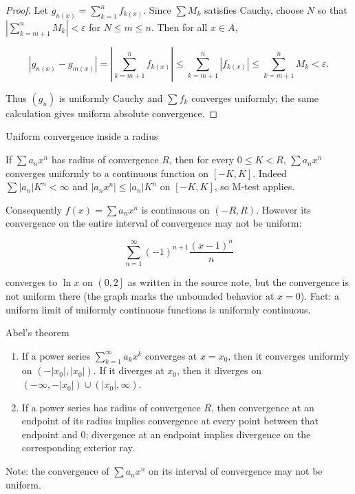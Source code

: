 \begin{proof}

Let \(g_{n{(x)}} = \sum_{k = 1}^{n}f_{k{(x)}}\). Since \(\sum M_{k}\) satisfies Cauchy, choose \(N\) so that \(\left| {\sum_{k = m + 1}^{n}M_{k}} \right| < \varepsilon\) for \(N \leq m \leq n\). Then for all \(x \in A\),

\[\left| {g_{n{(x)}} - g_{m{(x)}}} \right| = \left| {\sum\limits_{k = m + 1}^{n}f_{k{(x)}}} \right| \leq \sum\limits_{k = m + 1}^{n}\left| f_{k{(x)}} \right| \leq \sum\limits_{k = m + 1}^{n}M_{k} < \varepsilon.\]

Thus \(\left( g_{n} \right)\) is uniformly Cauchy and \(\sum f_{k}\) converges uniformly; the same calculation gives uniform absolute convergence.

\end{proof}

\begin{corollary}{Uniform convergence inside a radius}

If \(\sum a_{n}x^{n}\) has radius of convergence \(R\), then for every \(0 \leq K < R\), \(\sum a_{n}x^{n}\) converges uniformly to a continuous function on \(\left\lbrack {- K,K} \right\rbrack\). Indeed \(\sum\left| a_{n} \right|K^{n} < \infty\) and \(\left| {a_{n}x^{n}} \right| \leq \left| a_{n} \right|K^{n}\) on \(\left\lbrack {- K,K} \right\rbrack\), so M-test applies.

Consequently \(f(x) = \sum a_{n}x^{n}\) is continuous on \(\left( {- R,R} \right)\). However its convergence on the entire interval of convergence may not be uniform:

\[\sum\limits_{n = 1}^{\infty}\left( {- 1} \right)^{n + 1}\frac{\left( {x - 1} \right)^{n}}{n}\]

converges to \(\ln x\) on \(\left( {0,2} \right\rbrack\) as written in the source note, but the convergence is not uniform there (the graph marks the unbounded behavior at \(x = 0\)). Fact: a uniform limit of uniformly continuous functions is uniformly continuous.

\end{corollary}

\begin{theorem}{Abel's theorem}

\begin{enumerate}
\tightlist
\item
  If a power series \(\sum_{k = 1}^{\infty}a_{k}x^{k}\) converges at \(x = x_{0}\), then it converges uniformly on \(\left( {- \left| x_{0} \right|,\left| x_{0} \right|} \right)\). If it diverges at \(x_{0}\), then it diverges on \(\left( {- \infty, - \left| x_{0} \right|} \right) \cup \left( {\left| x_{0} \right|,\infty} \right)\).
\item
  If a power series has radius of convergence \(R\), then convergence at an endpoint of its radius implies convergence at every point between that endpoint and \(0\); divergence at an endpoint implies divergence on the corresponding exterior ray.
\end{enumerate}

Note: the convergence of \(\sum a_{n}x^{n}\) on its interval of convergence may not be uniform.

\end{theorem}

